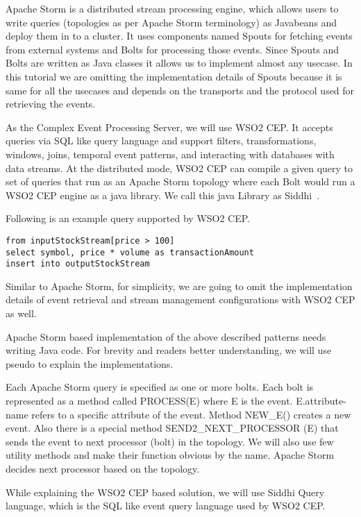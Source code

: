 \documentclass{sig-alternate}
\begin{document}
{Apache Storm is a distributed stream processing engine, which allows users to write queries (topologies as per Apache Storm terminology) as Javabeans and deploy them in to a cluster. It uses components named Spouts for fetching events from external systems and Bolts for processing those events. Since Spouts and Bolts are written as Java classes it allows us to implement almost any usecase. In this tutorial we are omitting the implementation details of Spouts because it is same for all the usecases and depends on the transports and the protocol used for retrieving the events. 

As the Complex Event Processing Server, we will use WSO2 CEP. It accepts queries via SQL like query language and support filters, transformations, windows, joins, temporal event patterns, and interacting with databases with data streams. At the distributed mode, WSO2 CEP can compile a given query to set of queries that run as an Apache Storm topology where each Bolt would run a WSO2 CEP engine as a java library. We call this java Library as Siddhi~\cite{siddhilib}.

Following is an example query supported by WSO2 CEP. 

\lstset{language=siddhi}
\begin{lstlisting}[mathescape]
from inputStockStream[price > 100]
select symbol, price * volume as transactionAmount
insert into outputStockStream
\end{lstlisting}


Similar to Apache Storm, for simplicity, we are going to omit the implementation details of event retrieval and stream management configurations with WSO2 CEP as well. 

Apache Storm based implementation of the above described patterns needs writing Java code. For brevity and readers better understanding, we will use pseudo to explain the implementations. 

Each Apache Storm query is specified as one or more bolts. Each bolt is represented as a method called PROCESS(E) where E is the event. E.attribute-name refers to a specific attribute of the event. Method NEW\_E() creates a new event. Also there is a special method SEND2\_NEXT\_PROCESSOR (E) that sends the event to next processor (bolt) in the topology.  We will also use few utility methods and make their function obvious by the name. Apache Storm decides next processor based on the topology. 

While explaining the WSO2 CEP based solution, we will use Siddhi Query language, which is the SQL like event query language used by WSO2 CEP. 


}
\end{document}
